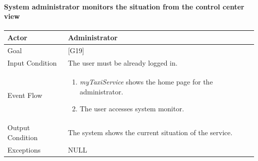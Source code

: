 \documentclass[a4paper,11pt]{report} %
\newcommand{\mts}{\mbox{\normalfont\itshape myTaxiService}}
\begin{document}
		\noindent%
		\begin{minipage}{\linewidth}
			\vspace*{-0.7cm}
		\end{minipage}	
	
	\pagebreak
	
	\paragraph{System administrator monitors the situation from the control center view}
	\begin{center}
		\begin{tabular}{| l | p{9cm} |}\hline
			Actor & Administrator\\\hline
			Goal & {[}G19{]} \\\hline
			Input Condition & The user must be already logged in.\\\hline
			Event Flow & \begin{enumerate}
				\item \mts{} shows the home page for the administrator.
				\item The user accesses system monitor.	
			\end{enumerate}\\\hline
			Output Condition & The system shows the current situation of the service.\\\hline
			Exceptions & NULL\\\hline
		\end{tabular}
	\end{center}
	
\end{document}
